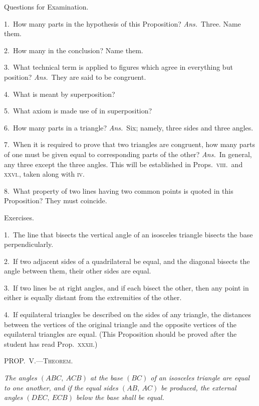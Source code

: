 \documentclass[oneside]{book}
\newcommand\mypropl[2]{
\bigskip\Needspace*{4\baselineskip}\begin{center}\textsc{#1}\end{center}
\hspace{\parindent}\emph{#2}\par\medskip
}
\newcommand\exhead[1]{
\Needspace*{5\baselineskip}\begin{center}
\textsf{#1}
\end{center}
}
\begin{document}
\exhead{Questions for Examination.}

\begin{footnotesize}
1.~How many parts in the hypothesis of this Proposition? \textit{Ans.}\
Three. Name them.

2.~How many in the conclusion? Name them.

3.~What technical term is applied to figures which agree in
everything but position? \textit{Ans.}\ They are said to be congruent.

4.~What is meant by superposition?

5.~What axiom is made use of in superposition?

6.~How many parts in a triangle? \textit{Ans.}\ Six; namely, three
sides and three angles.

7.~When it is required to prove that two triangles are congruent,
how many parts of one must be given equal to corresponding
parts of the other? \textit{Ans.}\ In general, any three except
the three angles. This will be established in Props.~\textsc{viii.}\ and
\textsc{xxvi.}, taken along with \textsc{iv.}

8.~What property of two lines having two common points is
quoted in this Proposition? They must coincide.
\par\end{footnotesize}

\exhead{Exercises.}

\begin{footnotesize}
1.~The line that bisects the vertical angle of an isosceles triangle
bisects the base perpendicularly.

2.~If two adjacent sides of a quadrilateral be equal, and the
diagonal bisects the angle between them, their other sides are
equal.

3.~If two lines be at right angles, and if each bisect the other,
then any point in either is equally distant from the extremities of
the other.

4.~If equilateral triangles be described on the sides of any
triangle, the distances between the vertices of the original triangle
and the opposite vertices of the equilateral triangles are equal.
(This Proposition should be proved after the student has read
Prop.~\textsc{xxxii.})
\par\end{footnotesize}


\mypropl{PROP\@.~V.---Theorem.}{The angles $(ABC,\ ACB)$ at the base $(BC)$ of an isosceles
triangle are equal to one another, and if the equal sides
$(AB,\ AC)$ be produced, the external angles $(DEC,\ ECB)$
below the base shall be equal.}
\end{document}
